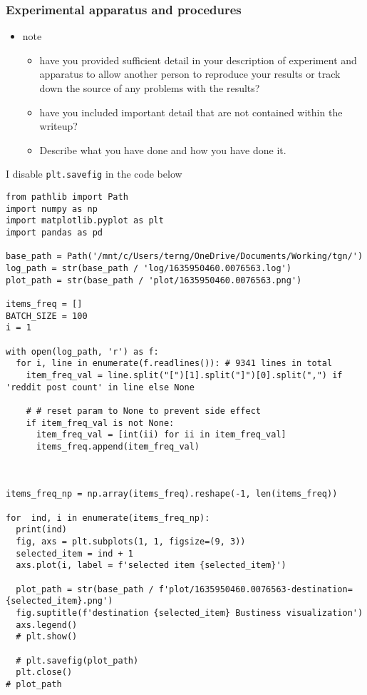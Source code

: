 \documentclass[11pt]{article}
\begin{document}
\subsubsection{Experimental apparatus and procedures}
\label{sec:org2389b48}
\begin{itemize}
\item note
\begin{itemize}
\item have you provided sufficient detail in your description of experiment and apparatus to allow another person to reproduce your results or track down the source of any problems with the results?
\item have you included important detail that are not contained within the writeup?
\item Describe what you have done and how you have done it.
\end{itemize}
\end{itemize}

I disable \texttt{plt.savefig} in the code below
\begin{verbatim}
from pathlib import Path
import numpy as np
import matplotlib.pyplot as plt
import pandas as pd

base_path = Path('/mnt/c/Users/terng/OneDrive/Documents/Working/tgn/')
log_path = str(base_path / 'log/1635950460.0076563.log')
plot_path = str(base_path / 'plot/1635950460.0076563.png')

items_freq = []
BATCH_SIZE = 100
i = 1

with open(log_path, 'r') as f:
  for i, line in enumerate(f.readlines()): # 9341 lines in total
    item_freq_val = line.split("[")[1].split("]")[0].split(",") if 'reddit post count' in line else None

    # # reset param to None to prevent side effect
    if item_freq_val is not None:
      item_freq_val = [int(ii) for ii in item_freq_val]
      items_freq.append(item_freq_val)



items_freq_np = np.array(items_freq).reshape(-1, len(items_freq))

for  ind, i in enumerate(items_freq_np):
  print(ind)
  fig, axs = plt.subplots(1, 1, figsize=(9, 3))
  selected_item = ind + 1
  axs.plot(i, label = f'selected item {selected_item}')

  plot_path = str(base_path / f'plot/1635950460.0076563-destination={selected_item}.png')
  fig.suptitle(f'destination {selected_item} Bustiness visualization')
  axs.legend()
  # plt.show()

  # plt.savefig(plot_path)
  plt.close()
# plot_path

\end{verbatim}
\end{document}
